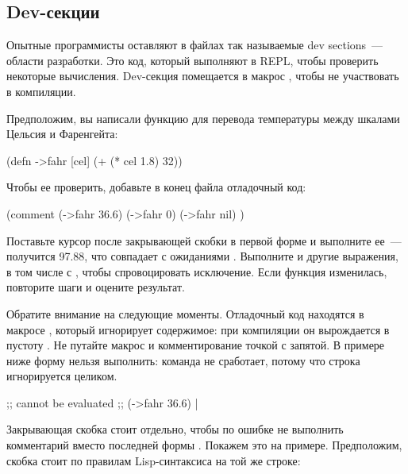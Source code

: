 \subsection{Dev-секции}

Опытные программисты оставляют в файлах так называемые dev sections~--- области разработки. Это код, который выполняют в REPL, чтобы проверить некоторые вычисления. Dev-секция помещается в макрос , чтобы не участвовать в компиляции.

Предположим, вы написали функцию  для перевода температуры между шкалами Цельсия и Фаренгейта:

\begin{english}
  \begin{clojure}
(defn ->fahr [cel]
  (+ (* cel 1.8) 32))
  \end{clojure}
\end{english}

Чтобы ее проверить, добавьте в конец файла отладочный код:

\begin{english}
  \begin{clojure/lines}
(comment
  (->fahr 36.6)
  (->fahr 0)
  (->fahr nil)
  )
  \end{clojure/lines}
\end{english}

Поставьте курсор после закрывающей скобки в первой форме и выполните ее~--- получится 97.88, что совпадает с ожиданиями . Выполните и другие выражения, в том числе с , чтобы спровоцировать исключение. Если функция изменилась, повторите шаги и оцените результат.

Обратите внимание на следующие моменты. Отладочный код находятся в макросе , который игнорирует содержимое: при компиляции он вырождается в пустоту . Не путайте макрос  и комментирование точкой с запятой. В примере ниже форму нельзя выполнить: команда  не сработает, потому что строка игнорируется целиком.

\begin{english}
  \begin{clojure}
;; cannot be evaluated
;; (->fahr 36.6) |
  \end{clojure}
\end{english}

Закрывающая скобка  стоит отдельно, чтобы по ошибке не выполнить комментарий вместо последней формы . Покажем это на примере. Предположим, скобка стоит по правилам Lisp-синтаксиса на той же строке:

